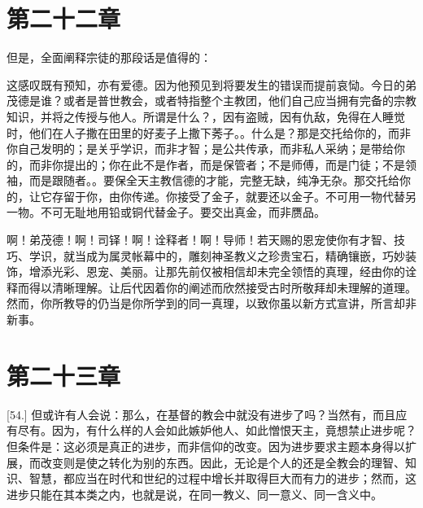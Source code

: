 
\section{第二十二章}

\par

但是，全面阐释宗徒的那段话是值得的：\par

这感叹既有预知，亦有爱德。因为他预见到将要发生的错误而提前哀恸。今日的弟茂德是谁？或者是普世教会，或者特指整个主教团，他们自己应当拥有完备的宗教知识，并将之传授与他人。所谓是什么？，因有盗贼，因有仇敌，免得在人睡觉时，他们在人子撒在田里的好麦子上撒下莠子。。什么是？那是交托给你的，而非你自己发明的；是关乎学识，而非才智；是公共传承，而非私人采纳；是带给你的，而非你提出的；你在此不是作者，而是保管者；不是师傅，而是门徒；不是领袖，而是跟随者。。要保全天主教信德的才能，完整无缺，纯净无杂。那交托给你的，让它存留于你，由你传递。你接受了金子，就要还以金子。不可用一物代替另一物。不可无耻地用铅或铜代替金子。要交出真金，而非赝品。\par

啊！弟茂德！啊！司铎！啊！诠释者！啊！导师！若天赐的恩宠使你有才智、技巧、学识，就当成为属灵帐幕中的，雕刻神圣教义之珍贵宝石，精确镶嵌，巧妙装饰，增添光彩、恩宠、美丽。让那先前仅被相信却未完全领悟的真理，经由你的诠释而得以清晰理解。让后代因着你的阐述而欣然接受古时所敬拜却未理解的道理。然而，你所教导的仍当是你所学到的同一真理，以致你虽以新方式宣讲，所言却非新事。\par


\section{第二十三章}

\par

[54.] 但或许有人会说：那么，在基督的教会中就没有进步了吗？当然有，而且应有尽有。因为，有什么样的人会如此嫉妒他人、如此憎恨天主，竟想禁止进步呢？但条件是：这必须是真正的进步，而非信仰的改变。因为进步要求主题本身得以扩展，而改变则是使之转化为别的东西。因此，无论是个人的还是全教会的理智、知识、智慧，都应当在时代和世纪的过程中增长并取得巨大而有力的进步；然而，这进步只能在其本类之内，也就是说，在同一教义、同一意义、同一含义中。\par

